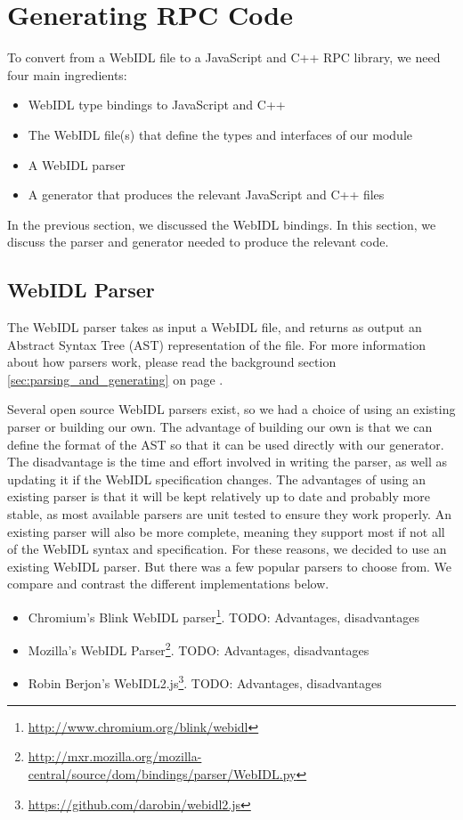 \section{Generating RPC Code} %
\label{sec:generating_rpc_code}
To convert from a WebIDL file to a JavaScript and C++ RPC library, we need four main ingredients:

\begin{itemize}
	\item WebIDL type bindings to JavaScript and C++
	\item The WebIDL file(s) that define the types and interfaces of our module
	\item A WebIDL parser
	\item A generator that produces the relevant JavaScript and C++ files
\end{itemize}

In the previous section, we discussed the WebIDL bindings. In this section, we discuss the parser and generator needed to produce the relevant code.

\subsection{WebIDL Parser} %
\label{sub:webidl_parser_design}
The WebIDL parser takes as input a WebIDL file, and returns as output an Abstract Syntax Tree (AST) representation of the file. For more information about how parsers work, please read the background section \ref{sec:parsing_and_generating} on page \pageref{sec:parsing_and_generating}. 

Several open source WebIDL parsers exist, so we had a choice of using an existing parser or building our own. The advantage of building our own is that we can define the format of the AST so that it can be used directly with our generator. The disadvantage is the time and effort involved in writing the parser, as well as updating it if the WebIDL specification changes. The advantages of using an existing parser is that it will be kept relatively up to date and probably more stable, as most available parsers are unit tested to ensure they work properly. An existing parser will also be more complete, meaning they support most if not all of the WebIDL syntax and specification. For these reasons, we decided to use an existing WebIDL parser. But there was a few popular parsers to choose from. We compare and contrast the different implementations below.

\begin{itemize}
	\item Chromium's Blink WebIDL parser\footnote{\url{http://www.chromium.org/blink/webidl}}. 
	TODO: Advantages, disadvantages
	\item Mozilla's WebIDL Parser\footnote{\url{http://mxr.mozilla.org/mozilla-central/source/dom/bindings/parser/WebIDL.py}}.
	TODO: Advantages, disadvantages
	\item Robin Berjon's WebIDL2.js\footnote{\url{https://github.com/darobin/webidl2.js}}. 
	TODO: Advantages, disadvantages

\end{itemize}

